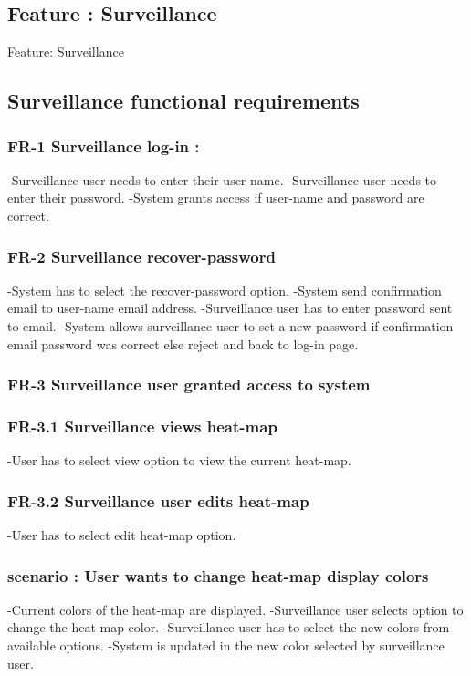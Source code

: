 \begin{Requirements}
\section{Feature : Surveillance}
Feature:  Surveillance 
\subsection{Surveillance functional requirements}
 \subsubsection{FR-1 Surveillance log-in :}
 		-Surveillance user needs to enter their user-name.
 		-Surveillance user needs to enter their password.
 		-System grants access if user-name and password are correct.
 \subsubsection{FR-2 Surveillance recover-password}
 		-System has to select the recover-password option.
 		-System send confirmation email to user-name email address.
		-Surveillance user has to enter password sent to email.
	  	-System allows surveillance user to set a new password if confirmation email password was correct else reject and back to 		   log-in page.
	  	
\subsubsection{FR-3 Surveillance user granted access to system}
\subsubsection{FR-3.1 Surveillance views heat-map}
		-User has to select view option to view the current heat-map.
\subsubsection{FR-3.2 Surveillance user edits heat-map}
		-User has to select edit heat-map option.
		\subsubsection{scenario : User wants to change heat-map display colors}
		-Current colors of the heat-map are displayed.
		-Surveillance user selects option to change the heat-map color.
		-Surveillance user has to select the new colors from available options.
		-System is updated in the new color selected by surveillance user.		

\end{Requirements}
